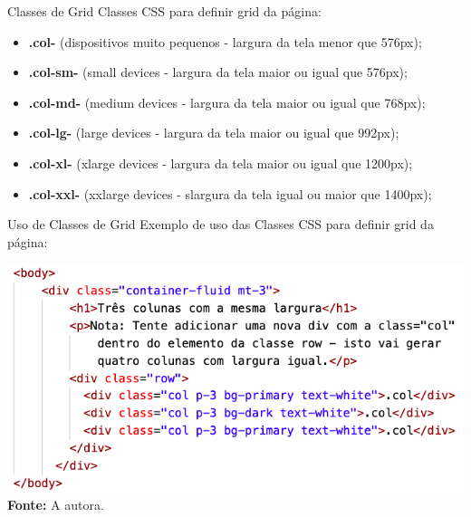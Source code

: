 \documentclass{beamer}
\begin{document}
\begin{frame}{Classes de Grid}
Classes CSS para definir grid da página:\\
\begin{itemize}
    \item \textbf{.col-} (dispositivos muito pequenos - largura da tela menor que 576px);
    \item \textbf{.col-sm-} (small devices - largura da tela maior ou igual que 576px);
    \item \textbf{.col-md-} (medium devices - largura da tela maior ou igual que 768px);
    \item \textbf{.col-lg-} (large devices - largura da tela maior ou igual que 992px);
    \item \textbf{.col-xl-} (xlarge devices - largura da tela maior ou igual que 1200px);
    \item \textbf{.col-xxl-} (xxlarge devices - slargura da tela igual ou maior que 1400px);
\end{itemize}
\cite{mdn2023}
\end{frame}
\begin{frame}{Uso de Classes de Grid}
Exemplo de uso das Classes CSS para definir grid da página:\\
    \begin{center}
       \includegraphics[height=0.5\paperheight]{fig/aula6/aula6_7.png} \\
       \tiny{\textbf{Fonte: } A autora.}
      \end{center}
\end{frame}
\end{document}

